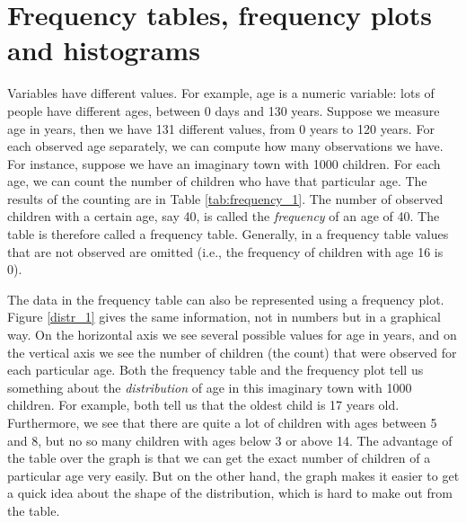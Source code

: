 \section{Frequency tables, frequency plots and histograms}

Variables have different values. For example, age is a numeric variable: lots of people have different ages, between 0 days and 130 years. Suppose we measure age in years, then we have 131 different values, from 0 years to 120 years. For each observed age separately, we can compute how many observations we have. For instance, suppose we have an imaginary town with 1000 children. For each age, we can count the number of children who have that particular age. The results of the counting are in Table \ref{tab:frequency_1}. The number of observed children with a certain age, say 40, is called the \textit{frequency} of an age of 40. The table is therefore called a frequency table. Generally, in a frequency table values that are not observed are omitted (i.e., the frequency of children with age 16 is 0).

\begin{kframe}


{\ttfamily\noindent\bfseries{}}\end{kframe}

\begin{knitrout}
\color{fgcolor}\begin{kframe}


{\ttfamily\noindent\bfseries{}}\end{kframe}
\end{knitrout}

The data in the frequency table can also be represented using a frequency plot. Figure \ref{distr_1} gives the same information, not in numbers but in a graphical way. On the horizontal axis we see several possible values for age in years, and on the vertical axis we see the number of children (the count) that were observed for each particular age. Both the frequency table and the frequency plot tell us something about the \textit{distribution} of age in this imaginary town with 1000 children. For example, both tell us that the oldest child is 17 years old. Furthermore, we see that there are quite a lot of children with ages between 5 and 8, but no so many children with ages below 3 or above 14. The advantage of the table over the graph is that we can get the exact number of children of a particular age very easily. But on the other hand, the graph makes it easier to get a quick idea about the shape of the distribution, which is hard to make out from the table.

